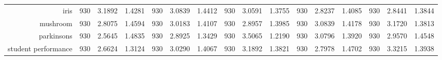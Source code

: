 \begin{table}[htbp]
{\begin{tabular}{rccccccccccccccc}
			iris                                & 930                                 & 3.1892                                                                    & 1.4281          & 930                                & 3.0839                                                                             & 1.4412          & 930                                & 3.0591                                                                    & 1.3755          & 930                                & \cellcolor[rgb]{ .776,  .937,  .808}\textcolor[rgb]{ 0,  .38,  0}{2.8237} & 1.4085          & 930                                    & 2.8441                                                                    & 1.3844          \\
			mushroom                            & 930                                 & \cellcolor[rgb]{ .776,  .937,  .808}\textcolor[rgb]{ 0,  .38,  0}{2.8075} & 1.4594          & 930                                & 3.0183                                                                             & 1.4107          & 930                                & 2.8957                                                                    & 1.3985          & 930                                & 3.0839                                                                    & 1.4178          & 930                                    & 3.1720                                                                    & 1.3813          \\
			parkinsons                          & 930                                 & \cellcolor[rgb]{ .776,  .937,  .808}\textcolor[rgb]{ 0,  .38,  0}{2.5645} & 1.4835          & 930                                & 2.8925                                                                             & 1.3429          & 930                                & 3.5065                                                                    & 1.2190          & 930                                & 3.0796                                                                    & 1.3920          & 930                                    & 2.9570                                                                    & 1.4548          \\
			student performance                 & 930                                 & \cellcolor[rgb]{ .776,  .937,  .808}\textcolor[rgb]{ 0,  .38,  0}{2.6624} & 1.3124          & 930                                & 3.0290                                                                             & 1.4067          & 930                                & 3.1892                                                                    & 1.3821          & 930                                & 2.7978                                                                    & 1.4702          & 930                                    & 3.3215                                                                    & 1.3938          \\

\end{tabular}}
\end{table}
